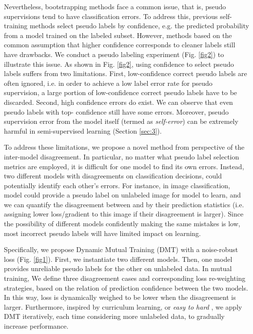 \documentclass[preprint,review,10pt]{elsarticle}
\begin{document}
Nevertheless, bootstrapping methods face a common issue, that is, pseudo supervisions tend to have classification errors. To address this, previous self-training methods \cite{lee2013pseudo,hung,cbst} select pseudo labels by confidence, e.g. the predicted probability from a model trained on the labeled subset. However, methods based on the common assumption that higher confidence corresponds to cleaner labels still have drawbacks. We conduct a pseudo labeling experiment (Fig. \ref{fig2}) to illustrate this issue.
As shown in Fig. \ref{fig2}, using confidence to select pseudo labels suffers from two limitations. First, low-confidence correct pseudo labels are often ignored, i.e. in order to achieve a low label error rate for pseudo supervision, a large portion of low-confidence correct pseudo labels have to be discarded. Second, high confidence errors do exist. We can observe that even pseudo labels with top- confidence still have some errors.
Moreover, pseudo supervision error from the model itself (termed as \textit{self-error}) can be extremely harmful in semi-supervised learning (Section \ref{sec:3}).

To address these limitations, we propose a novel method from  perspective of the inter-model disagreement. In particular, no matter what pseudo label selection metrics are employed, it is difficult for one model to find its own errors. Instead, two different models with disagreements on classification decisions, could potentially identify each other's errors. For instance, in image classification, model  could provide a pseudo label on unlabeled image  for model  to learn, and we can quantify the disagreement between  and  by their prediction statistics (i.e. assigning lower loss/gradient to this image if their disagreement is larger). Since the possibility of different models confidently making the same mistakes is low, most incorrect pseudo labels will have limited impact on learning.

Specifically, we propose Dynamic Mutual Training (DMT) with a noise-robust loss (Fig. \ref{fig1}). First, we instantiate two different models. Then, one model provides unreliable pseudo labels for the other on unlabeled data. In mutual training, We define three disagreement cases and corresponding loss re-weighting strategies, based on the relation of prediction confidence between the two models. In this way, loss is dynamically weighed to be lower when the disagreement is larger. Furthermore, inspired by 
curriculum learning, or \textit{easy to hard} \cite{bengio2009curriculum}, we apply DMT iteratively, each time considering more unlabeled data, to gradually increase performance.
\end{document}
